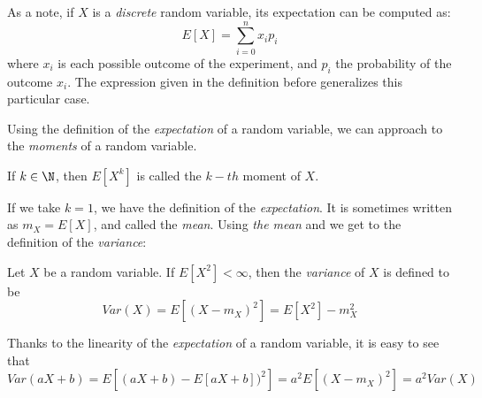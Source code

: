 As a note, if $X$ is a \emph{discrete} random variable, its expectation can be computed as:
$$
E[X] = \sum_{i = 0}^n x_i p_i
$$
where $x_i$ is each possible outcome of the experiment, and $p_i$ the probability of the outcome $x_i$. The expression given in the definition before generalizes this particular case.

Using the definition of the \emph{expectation} of a random variable, we can approach to the \emph{moments} of a random variable.

\begin{ndef}
If $k \in \N$, then $E[X^k]$ is called the $k-th$ moment of $X$.
\end{ndef}
If we take $k = 1$, we have the definition of the \emph{expectation}. It is sometimes written as $m_X = E[X]$, and called the \emph{mean}. Using  \emph{the mean} and we get to the definition of the \emph{variance}:

\begin{ndef}
Let $X$ be a random variable. If $E[X^2] < \infty$, then the \emph{variance} of $X$ is defined to be
$$
Var(X) = E[(X - m_X)^2] = E[X^2] - m_X^2 
$$
\end{ndef}

Thanks to the linearity of the \emph{expectation} of a random variable, it is easy to see that
$$
Var(aX + b) = E[(aX + b) - E[aX + b])^2] = a^2E[(X - m_X)^2] = a^2 Var(X)
$$

